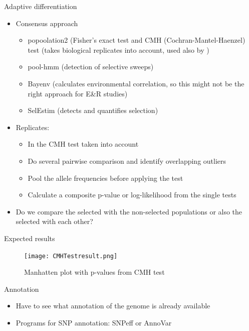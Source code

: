 \documentclass[presentation]{beamer}
\begin{document}
\begin{frame}[label=sec-28]{Adaptive differentiation}
\begin{itemize}
\item Consensus approach
\begin{itemize}
\item popoolation2 (Fisher's exact test and CMH (Cochran-Mantel-Haenzel)
test (takes biological replicates into account, used also by \citep{Huang2014})
\item pool-hmm (detection of selective sweeps)
\item Bayenv (calculates environmental correlation, so this might not be the right approach for E\&R studies)
\item SelEstim (detects and quantifies selection)
\end{itemize}

\item \alert{Replicates}: 
\begin{itemize}
\item In the CMH test taken into account
\item Do several pairwise comparison and identify overlapping outliers
\item Pool the allele frequencies before applying the test
\item Calculate a composite p-value or log-likelihood from the single tests
\end{itemize}
\end{itemize}


\begin{itemize}
\item Do we compare the selected with the non-selected populations or also
the selected with each other?
\end{itemize}
\end{frame}
\begin{frame}[label=sec-29]{Expected results}
\begin{figure}[htb]
\centering
\texttt{[image: CMHTestresult.png]}
\caption{Manhatten plot with p-values from CMH test}
\end{figure}
\end{frame}

\begin{frame}[label=sec-30]{Annotation}
\begin{itemize}
\item Have to see what annotation of the genome is already available
\item Programs for SNP annotation: SNPeff or AnnoVar
\end{itemize}
\end{frame}
\end{document}
